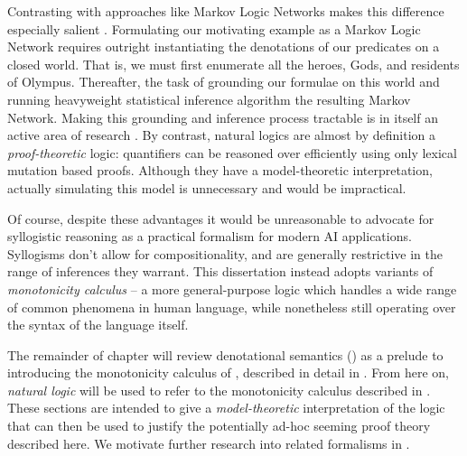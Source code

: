 Contrasting with approaches like Markov Logic Networks makes this difference especially salient
  \cite{key:2006richardson-mln}.
Formulating our motivating example as a Markov Logic Network requires outright instantiating
  the denotations of our predicates on a closed world.
That is, we must first enumerate all the heroes, Gods, and residents of Olympus.
Thereafter, the task of grounding our formulae on this world and running heavyweight
  statistical inference algorithm the resulting Markov Network.
Making this grounding and inference process tractable is in itself an active area of
  research \cite{key:2011niu-tuffy,key:2014zhang-dimmwitted}.
By contrast, natural logics are almost by definition a \textit{proof-theoretic} logic:
  quantifiers can be reasoned over efficiently using only lexical mutation based proofs.
Although they have a model-theoretic interpretation, actually simulating this model
  is unnecessary and would be impractical.


Of course, despite these advantages it would be unreasonable to advocate for syllogistic
  reasoning as a practical formalism for modern AI applications.
Syllogisms don't allow for compositionality, and are generally restrictive in
  the range of inferences they warrant.
This dissertation instead adopts variants of \textit{monotonicity calculus}
  \cite{key:1986benthem-natlog,key:1991valencia-natlog}
  -- a more general-purpose logic which handles a wide range of common phenomena in human
  language, while nonetheless still operating over the syntax of the language itself.


%
%
The remainder of chapter will review denotational semantics ()
  as a prelude to introducing the monotonicity calculus of ,
  described in detail in .
From here on, \textit{natural logic} will be used to refer to the monotonicity calculus
  described in .
These sections are intended to give a \textit{model-theoretic} interpretation of the logic
  that can then be used to justify the potentially ad-hoc seeming proof theory described
  here.
We motivate further research into related formalisms in .
